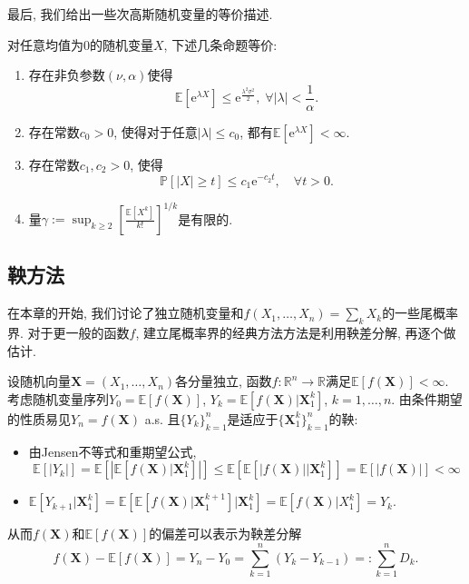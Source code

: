 最后, 我们给出一些次高斯随机变量的等价描述. 
\begin{theorem}[次高斯随机变量的等价定义]
	对任意均值为$0$的随机变量$X$, 下述几条命题等价: 
	\begin{enumerate}[label=(\Roman*)]
		\item 存在非负参数$(\nu, \alpha)$使得
			\begin{equation*}
				\mathbb{E}[\mathrm{e}^{\lambda X} ] \leq \mathrm{e}^{\frac{\lambda^2 \sigma^2}{2}},\; \forall |\lambda| < \frac{1}{\alpha}. 
			\end{equation*}
		\item 存在常数$c_0 > 0$, 使得对于任意$|\lambda| \leq c_0$, 都有$\mathbb{E}[\mathrm{e}^{\lambda X}] < \infty$. 
		\item 存在常数$c_1, c_2 > 0$, 使得
			\begin{equation*}
				\mathbb{P}[|X| \geq t] \leq c_1 \mathrm{e}^{-c_2 t},\quad \forall t > 0. 
			\end{equation*}
		\item 量$\displaystyle \gamma:= \sup_{k \geq 2} \left[ \frac{\mathbb{E}[X^k]}{k!} \right]^{1/k}$是有限的. 
	\end{enumerate}
\end{theorem}


\subsection{鞅方法}

在本章的开始, 我们讨论了独立随机变量和$f(X_1, \dots, X_n) = \sum_k X_k$的一些尾概率界. 
对于更一般的函数$f$, 建立尾概率界的经典方法方法是利用鞅差分解, 再逐个做估计. 

设随机向量$\bm{X} = (X_1, \dots, X_n)$各分量独立, 函数$f \colon \mathbb{R}^n \to \mathbb{R}$满足$\mathbb{E}[f(\bm{X})] < \infty$. 
考虑随机变量序列$Y_0 = \mathbb{E}[f(\bm{X})]$, $Y_k = \mathbb{E}[f(\bm{X})|\bm{X}_1^k]$, $k = 1, \dots, n$. 
由条件期望的性质易见$Y_n = f(\bm{X})$ a.s. 且$\{Y_k\}_{k=1}^n$是适应于$\{\bm{X}_1^k\}_{k=1}^n$的鞅: 
\begin{itemize}
	\item 由Jensen不等式和重期望公式, 
		\begin{equation*}
			\mathbb{E}[|Y_k|]
			= \mathbb{E}\left[\left|\mathbb{E}[f(\bm{X})|\bm{X}_1^k]\right|\right] 
			\leq \mathbb{E}\left[\mathbb{E}[|f(\bm{X})||\bm{X}_1^k] \right]
			= \mathbb{E}[|f(\bm{X})|]
			< \infty
		\end{equation*}
	\item $\mathbb{E}[Y_{k+1}|\bm{X}_1^k] = \mathbb{E}\left[\mathbb{E}[f(\bm{X})|\bm{X}_1^{k+1}] \big|\bm{X}_1^k\right] = \mathbb{E}[f(\bm{X}) | X_1^k] = Y_k$. 
\end{itemize}
从而$f(\bm{X})$和$\mathbb{E}[f(\bm{X})]$的偏差可以表示为鞅差分解
\begin{equation*}
	f(\bm{X}) - \mathbb{E}[f(\bm{X})] 
	= Y_n - Y_0 
	= \sum_{k=1}^n (Y_k - Y_{k-1})
	=: \sum_{k=1}^n D_k.
\end{equation*}

